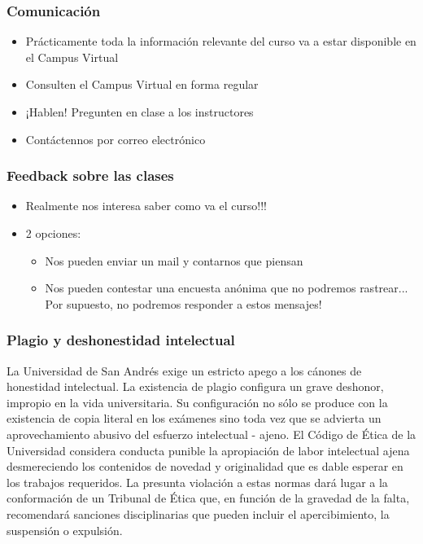 \documentclass{beamer}
\begin{document}
\begin{frame}
\frametitle{Comunicación}
\begin{itemize}
    \item Prácticamente toda la información relevante del curso va a estar disponible en el Campus Virtual
    \item Consulten el Campus Virtual en forma regular
    \item ¡Hablen! Pregunten en clase a los instructores
    \item Contáctennos por correo electrónico 
\end{itemize}
\end{frame}

\begin{frame}
\frametitle{Feedback sobre las clases}
\begin{itemize}
    \item Realmente nos interesa saber como va el curso!!! \vspace{2mm}
    \item 2 opciones: \vspace{2mm}
        \begin{itemize}
            \item Nos pueden enviar un mail y contarnos que piensan 
            \item Nos pueden contestar una encuesta anónima que no podremos rastrear... Por supuesto, no podremos responder a estos mensajes!
  
        \end{itemize}
\end{itemize}
\end{frame}

\begin{frame}
\frametitle{Plagio y deshonestidad intelectual}
\small{
    La Universidad de San Andrés exige un estricto apego a los cánones de honestidad intelectual. La existencia de plagio configura un grave deshonor, impropio en la vida universitaria. Su configuración no sólo se produce con la existencia de copia literal en los exámenes sino toda vez que se advierta un aprovechamiento abusivo del esfuerzo intelectual  - ajeno. El Código de Ética de la Universidad considera conducta punible la apropiación de labor intelectual ajena desmereciendo los contenidos de novedad y originalidad que es dable esperar en los trabajos requeridos. La presunta violación a estas normas dará lugar a la conformación de un Tribunal de Ética que, en función de la gravedad de la falta, recomendará sanciones disciplinarias que pueden incluir el apercibimiento, la suspensión o expulsión.}
\end{frame}
\end{document}
